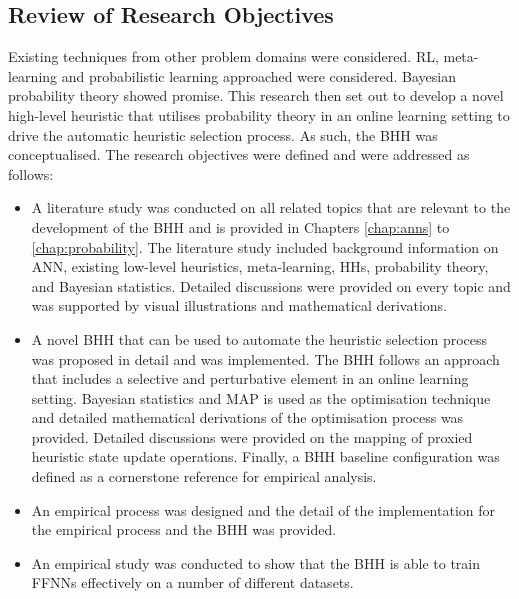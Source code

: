 \subsection{Review of Research Objectives}
\label{sec:conclusion:research_goals:research_objectives}

Existing techniques from other problem domains were considered. \acs{RL}, meta-learning and probabilistic learning approached were considered. Bayesian probability theory showed promise. This research then set out to develop a novel high-level heuristic that utilises probability theory in an online learning setting to drive the automatic heuristic selection process. As such, the \acs{BHH} was conceptualised. The research objectives were defined and were addressed as follows:

\begin{itemize}
      \item A literature study was conducted on all related topics that are relevant to the development of the \acs{BHH} and is provided in Chapters \ref{chap:anns} to \ref{chap:probability}. The literature study included background information on \acs{ANN}, existing low-level heuristics, meta-learning, \acp{HH}, probability theory, and Bayesian statistics. Detailed discussions were provided on every topic and was supported by visual illustrations and mathematical derivations.

      \item A novel \acs{BHH} that can be used to automate the heuristic selection process was proposed in detail and was implemented. The \acs{BHH} follows an approach that includes a selective and perturbative element in an online learning setting. Bayesian statistics and \acs{MAP} is used as the optimisation technique and detailed mathematical derivations of the optimisation process was provided. Detailed discussions were provided on the mapping of proxied heuristic state update operations. Finally, a \acs{BHH} baseline configuration was defined as a cornerstone reference for empirical analysis.

      \item An empirical process was designed and the detail of the implementation for the empirical process and the \acs{BHH} was provided.

      \item An empirical study was conducted to show that the \ac{BHH} is able to train \acp{FFNN} effectively on a number of different datasets.


\end{itemize}
